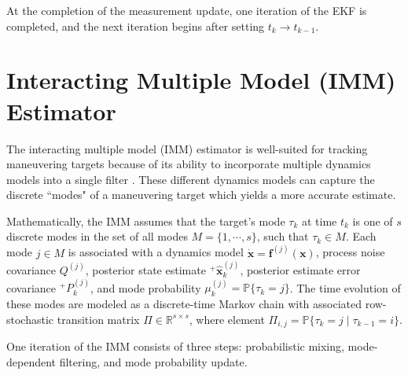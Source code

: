 At the completion of the measurement update, one iteration of the EKF is completed, and the next iteration begins after setting $ t_k \rightarrow t_{k-1}$. 

\section{Interacting Multiple Model (IMM) Estimator}

The interacting multiple model (IMM) estimator is well-suited for tracking maneuvering targets because of its ability to incorporate multiple dynamics models into a single filter \cite{blom1988interacting,bar1989tracking,genovese2001interacting}. These different dynamics models can capture the discrete ``modes" of a maneuvering target which yields a more accurate estimate. 

Mathematically, the IMM assumes that the target's mode $\tau_k$ at time $t_k$ is one of $s$ discrete modes in the set of all modes $M = \{1, \cdots, s\}$, such that $\tau_k \in M $. Each mode $j \in M$ is associated with a dynamics model $\dot{\bm{x}} = \bm{f}^{(j)}(\bm{x})$, process noise covariance $Q^{(j)}$, posterior state estimate ${}^+\hat{\bm{x}}_k^{(j)}$, posterior estimate error covariance ${}^+P_k^{(j)}$, and mode probability $\mu^{(j)}_k = \mathbb{P}\{\tau_k = j\}$. The time evolution of these modes are modeled as a discrete-time Markov chain with associated row-stochastic transition matrix $\Pi \in \mathbb{R}^{s \times s}$, where element $\Pi_{i, j} = \mathbb{P}\{\tau_k=j \mid \tau_{k-1} = i\}$.

One iteration of the IMM consists of three steps: probabilistic mixing, mode-dependent filtering, and mode probability update.

